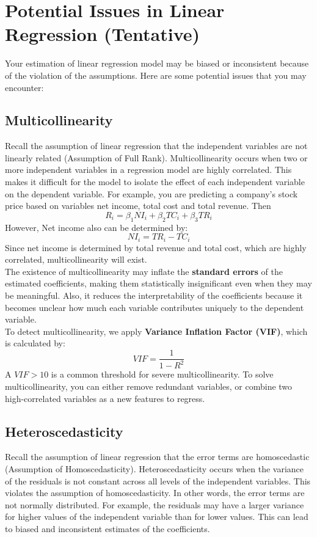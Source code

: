 \documentclass[11pt]{article}
\begin{document}
\section{Potential Issues in Linear Regression (Tentative)}

Your estimation of linear regression model may be biased or inconsistent because of the violation of the assumptions. Here are some potential issues that you may encounter:

\subsection{Multicollinearity}

Recall the assumption of linear regression that the independent variables are not linearly related (Assumption of Full Rank). Multicollinearity occurs when two or more independent variables in a regression model are highly correlated. This makes it difficult for the model to isolate the effect 
of each independent variable on the dependent variable. For example, you are predicting a company’s stock price based on variables net income, total cost and total revenue. Then
\[R_i=\beta_1NI_i+\beta_2TC_i+\beta_3TR_i\]
However, Net income also can be determined by:
\[NI_i=TR_i-TC_i\]
Since net income is determined by total revenue and total cost, which are highly correlated, multicollinearity will exist. \\
The existence of multicollinearity may inflate the \textbf{standard errors} of the estimated coefficients, making them statistically insignificant even when they may be meaningful. Also, 
it reduces the interpretability of the coefficients because it becomes unclear how much each variable contributes uniquely to the dependent variable. \\
To detect multicollinearity, we apply \textbf{Variance Inflation Factor (VIF)}, which is calculated by:
\[
VIF = \frac{1}{1-R^2}
\]
A $VIF > 10$ is a common threshold for severe multicollinearity. To solve multicollinearity, you can either remove redundant variables, or combine two high-correlated variables as a new features
to regress.

\subsection{Heteroscedasticity}

Recall the assumption of linear regression that the error terms are homoscedastic (Assumption of Homoscedasticity). 
Heteroscedasticity occurs when the variance of the residuals is not constant across all levels of the independent variables. This violates the assumption of homoscedasticity. In other words, the error terms are not normally distributed.
For example, the residuals may have a larger variance for higher values of the independent variable than for lower values. This can lead to biased and inconsistent estimates of the coefficients. \\
\end{document}
